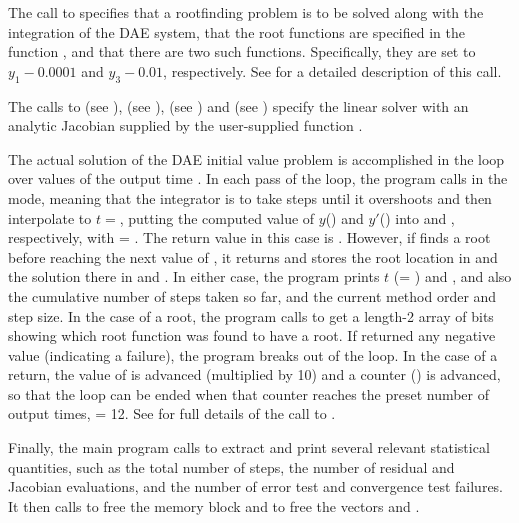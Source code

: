 The call to  specifies that a rootfinding problem
is to be solved along with the integration of the DAE system, that the
root functions are specified in the function , and that there are
two such functions.  Specifically, they are set to $y_1 - 0.0001$ and 
$y_3 - 0.01$, respectively.
See  for a detailed description of this call.

The calls to  (see ),
 (see ),
 (see )
and  (see ) specify the {\sunlinsoldense}
linear solver with an analytic Jacobian supplied by the user-supplied function
.

The actual solution of the DAE initial value problem is accomplished in
the loop over values of the output time .  In each pass of the
loop, the program calls  in the  mode, meaning
that the integrator is to take steps until it overshoots  and then
interpolate to $t =  $, putting the computed value of $y$()
and $y'$() into  and , respectively, with
 = .  The return value in this case is .
However, if  finds a root before reaching the next value
of , it returns  and stores the root
location in  and the solution there in  and .  In
either case, the program prints $t$ (= ) and , and
also the cumulative number of steps taken so far, and the current
method order and step size.
In the case of a root, the program calls  to get a
length-2 array  of bits showing which root function was
found to have a root.  If  returned any negative value
(indicating a failure), the program breaks out of the loop.  In the
case of a  return, the value of  is advanced
(multiplied by 10) and a counter () is advanced, so that the
loop can be ended when that counter reaches the preset number of
output times,  = 12.  See  for full
details of the call to .

Finally, the main program calls  to extract and
print several relevant statistical quantities, such as the total
number of steps, the number of residual and Jacobian evaluations, and
the number of error test and convergence test failures.  It then calls
 to free the {\ida} memory block and 
to free the vectors  and .


